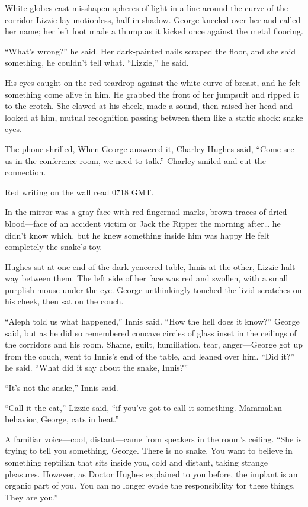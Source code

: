 White globes cast misshapen spheres of light in a line around the curve of the corridor Lizzie lay motionless, half in shadow. George kneeled over her and called her name; her left foot made a thump as it kicked once against the metal flooring.

“What’s wrong?” he said. Her dark-painted nails scraped the floor, and she said something, he couldn't tell what. “Lizzie,” he said.

His eyes caught on the red teardrop against the white curve of breast, and he felt something come alive in him. He grabbed the front of her jumpsuit and ripped it to the crotch. She clawed at his cheek, made a sound, then raised her head and looked at him, mutual recognition passing between them like a static shock: snake eyes.

The phone shrilled, When George answered it, Charley Hughes said, “Come see us in the conference room, we need to talk.” Charley smiled and cut the connection.

Red writing on the wall read 0718 GMT.

In the mirror was a gray face with red fingernail marks, brown traces of dried blood—face of an accident victim or Jack the Ripper the morning after… he didn’t know which, but he knew something inside him was happy He felt completely the snake’s toy.

Hughes sat at one end of the dark-yeneered table, Innis at the other, Lizzie halt-way between them. The left side of her face was red and swollen, with a small purplish mouse under the eye. George unthinkingly touched the livid scratches on his cheek, then sat on the couch.

“Aleph told us what happened,” Innis said. “How the hell does it know?” George said, but as he did so remembered concave circles of glass inset in the ceilings of the corridors and his room. Shame, guilt, humiliation, tear, anger—George got up from the couch, went to Innis’s end of the table, and leaned over him. “Did it?” he said. “What did it say about the snake, Innis?”

“It’s not the snake,” Innis said.

“Call it the cat,” Lizzie said, “if you’ve got to call it something. Mammalian behavior, George, cats in heat.”

A familiar voice—cool, distant—came from speakers in the room’s ceiling. “She is trying to tell you something, George. There is no snake. You want to believe in something reptilian that sits inside you, cold and distant, taking strange pleasures. However, as Doctor Hughes explained to you before, the implant is an organic part of you. You can no longer evade the responsibility tor these things. They are you.”

